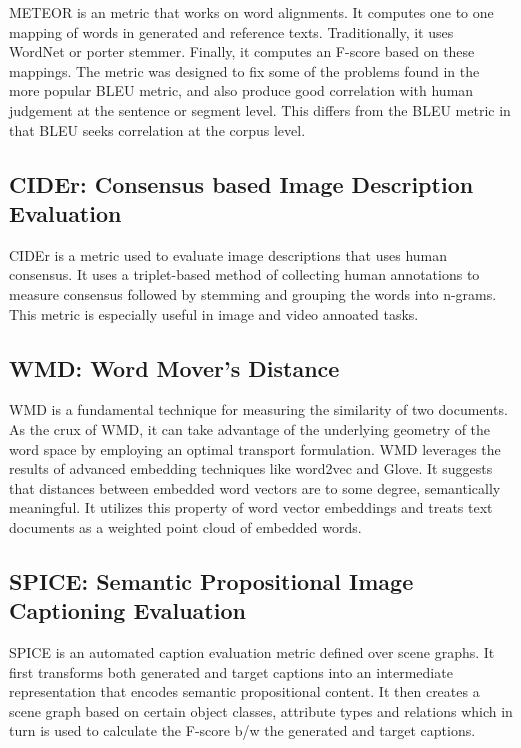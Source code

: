 \par METEOR \cite{meteor} is an metric that works on word alignments. It computes one to one mapping of words in generated and reference texts. Traditionally, it uses WordNet or porter stemmer. Finally, it computes an F-score based on these mappings. The metric was designed to fix some of the problems found in the more popular BLEU metric, and also produce good correlation with human judgement at the sentence or segment level. This differs from the BLEU metric in that BLEU seeks correlation at the corpus level.


\subsection{CIDEr: Consensus based Image Description Evaluation}

\par CIDEr \cite{cider} is a metric used to evaluate image descriptions that uses human consensus. It uses a triplet-based method of collecting human annotations to measure consensus followed by stemming and grouping the words into n-grams. This metric is especially useful in image and video annoated tasks.

\subsection{WMD: Word Mover's Distance}

\par WMD \cite{wmd} is a fundamental technique for measuring the similarity of two documents. As the crux of WMD, it can take advantage of the underlying geometry of the word space by employing an optimal transport formulation. WMD leverages the results of advanced embedding techniques like word2vec and Glove. It suggests that distances between embedded word vectors are to some degree, semantically meaningful. It utilizes this property of word vector embeddings and treats text documents as a weighted point cloud of embedded words. 

\subsection{SPICE: Semantic Propositional Image Captioning Evaluation}

\par SPICE \cite{spice} is an automated caption evaluation metric defined over scene graphs. It first transforms  both generated and target captions into an intermediate representation that encodes semantic propositional content. It then creates a scene graph based on certain object classes, attribute types and relations which in turn is used to calculate the F-score b/w the generated and target captions. 